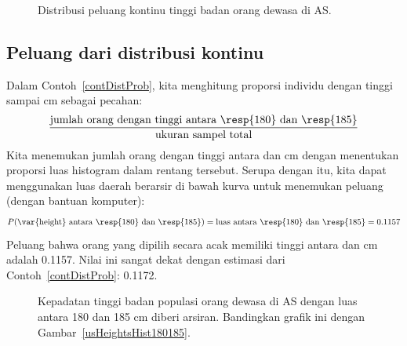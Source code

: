 \begin{figure}[tbh]
\centering
{}
\caption{Distribusi peluang kontinu tinggi badan orang dewasa di AS.}
\label{fdicHeightContDist}
\end{figure}



\D{\newpage}

\subsection{Peluang dari distribusi kontinu}

Dalam Contoh~\ref{contDistProb}, kita menghitung proporsi individu dengan tinggi  sampai  cm sebagai pecahan:
\begin{align*}
\frac{\text{jumlah orang dengan tinggi antara \resp{180} dan \resp{185}}}{\text{ukuran sampel total}}
\end{align*}
Kita menemukan jumlah orang dengan tinggi antara  dan  cm dengan menentukan proporsi luas histogram dalam rentang tersebut. Serupa dengan itu, kita dapat menggunakan luas daerah berarsir di bawah kurva untuk menemukan peluang (dengan bantuan komputer):
\begin{align*}
P(\text{\var{height} antara \resp{180} dan \resp{185}})
	= \text{luas antara \resp{180} dan \resp{185}}
	= 0.1157
\end{align*}
Peluang bahwa orang yang dipilih secara acak memiliki tinggi antara  dan  cm adalah 0.1157. Nilai ini sangat dekat dengan estimasi dari Contoh~\ref{contDistProb}: 0.1172.

\begin{figure}[h]
  \centering
  \caption{Kepadatan tinggi badan populasi orang dewasa di AS
      dengan luas antara 180 dan 185 cm diberi arsiran.
      Bandingkan grafik ini dengan Gambar~\ref{usHeightsHist180185}.}
  \label{fdicHeightContDistFilled}
\end{figure}

